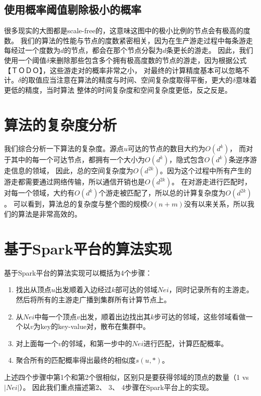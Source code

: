 \documentclass[master]{njuthesis}
\begin{document}
\subsection{使用概率阈值剔除极小的概率}
很多现实的大图都是scale-free\cite{li2005towards}的，这意味这图中的极小比例的节点会有极高的度数。
我们的算法的性能与节点的度数紧密相关，因为在生产游走过程中每条游走每经过一个度数为$d$的节点，都会在那个节点分裂为$d$条更长的游走。
因此，我们使用一个阈值\cite{lizorkin2008accuracy}$\delta$来删除那些包含多个拥有极高度数的节点的游走，因为根据公式【ＴＯＤＯ】，这些游走对的概率非常之小，
对最终的计算精度基本可以忽略不计。$\delta$的取值应当注意在算法的精度与时间、空间复杂度取得平衡，更大的$\delta$意味着更低的精度，当时算法
整体的时间复杂度和空间复杂度更低，反之反是。
\section{算法的复杂度分析}
我们综合分析一下算法的复杂度。源点$u$可达的节点的数目大约为$O(d^k)$，
而对于其中的每一个可达节点，都拥有一个大小为$O(d^k)$，隐式包含$O(d^k)$条逆序游走信息的领域，
因此，总的空间复杂度为$O(d^{2k})$。因为这个过程中所有产生的游走都需要通过网络传输，所以通信开销也是$O(d^{2k})$。
在对游走进行匹配时，对每一个领域，大约有$O(d^k)$个游走被匹配了，所以总的计算复杂度为$O(d^{2k})$。
可以看到，算法总的复杂度与整个图的规模$O(n+m)$没有以来关系，所以我们的算法是非常高效的。
\section{基于Spark平台的算法实现}
基于Spark平台的算法实现可以概括为4个步骤：
\begin{enumerate}
 \item 找出从顶点$u$出发顺着入边经过$k$部可达的邻域$Nei$，同时记录所有的主游走。然后将所有的主游走广播到集群所有计算节点上。
 \item 从$Nei$中每一个顶点$v$出发，顺着出边找出其$k$步可达的邻域，这些邻域看做一个以$v$为key的key-value对，散布在集群中。
 \item 对上面每一个$v$的邻域，和第一步中的$Nei$进行匹配，计算匹配概率。
 \item 聚合所有的匹配概率得出最终的相似度$s(u,*)$。
\end{enumerate}
上述四个步骤中第1个和第2个很相似，区别只是要获得邻域的顶点的数量（1 vs $|Nei|$）。
因此我们重点描述第2、 3、 4步骤在Spark平台上的实现。
\end{document}
